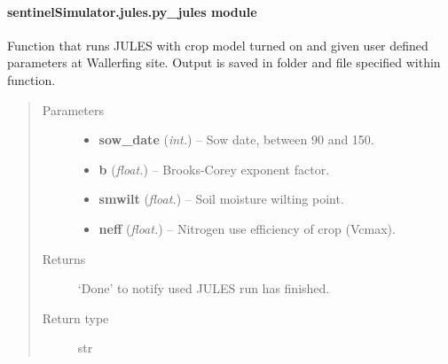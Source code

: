 \documentclass[letterpaper,10pt,english]{sphinxmanual}
\begin{document}
\paragraph{sentinelSimulator.jules.py\_jules module}
\label{source/sentinelSimulator.jules:sentinelsimulator-jules-py-jules-module}\label{source/sentinelSimulator.jules:module-sentinelSimulator.jules.py_jules}

\begin{fulllineitems}
\label{source/sentinelSimulator.jules:sentinelSimulator.jules.py_jules.crop_run}
Function that runs JULES with crop model turned on and given user defined parameters at Wallerfing site. Output is
saved in folder and file specified within function.
\begin{quote}\begin{description}
\item[{Parameters}] \leavevmode\begin{itemize}
\item {} 
\textbf{sow\_date} (\emph{int.}) -- Sow date, between 90 and 150.

\item {} 
\textbf{b} (\emph{float.}) -- Brooks-Corey exponent factor.

\item {} 
\textbf{smwilt} (\emph{float.}) -- Soil moisture wilting point.

\item {} 
\textbf{neff} (\emph{float.}) -- Nitrogen use efficiency of crop (Vcmax).

\end{itemize}

\item[{Returns}] \leavevmode
`Done' to notify used JULES run has finished.

\item[{Return type}] \leavevmode
str

\end{description}\end{quote}

\end{fulllineitems}

\end{document}
